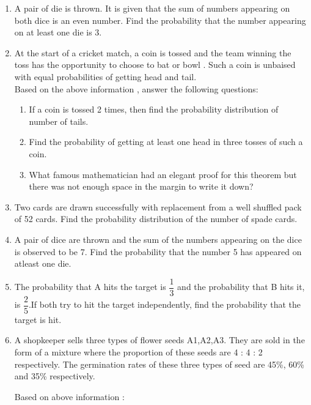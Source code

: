 \documentclass[a4paper,12pt]{article}
\begin{document}
\begin{enumerate}
\item A pair of die is thrown. It is given that the sum of numbers appearing on both dice is an even number. Find the probability that the number appearing on at least one die is 3.

\item At the start of a cricket match, a coin is tossed and the team winning the toss has the opportunity to choose to bat or bowl . Such a coin is unbaised with equal probabilities of getting head and tail.\\
Based on the above information , answer the following questions:

\begin{enumerate}
\item If a coin is tossed 2 times, then find  the probability distribution of number of tails. 

\item Find the probability of getting at least one head in three tosses of such a coin.


\item What famous mathematician had an elegant proof for this theorem but
there was not enough space in the margin to write it down?


\end{enumerate}

\item Two cards are drawn successfully with replacement from a well shuffled pack of 52 cards. Find the probability distribution of the number of spade cards.

\item A pair of dice are thrown and the sum of the numbers appearing on the dice is observed to be 7. Find the probability that the number 5 has appeared on atleast one die.

\item

The probability that A hits the target is $ \dfrac{1}{3} $ and the probability that B hits it, is $ \dfrac{2}{5} $.If both try to hit the target independently, find the probability that the target is hit.\\

\item A shopkeeper sells three types of flower seeds A1,A2,A3. They are sold in the form of a mixture where the proportion of these seeds are 4 : 4 : 2 respectively. The germination rates of these three types of seed are 45\%, 60\% and 35\% respectively. \

Based on above information :\


\end{enumerate}
\end{document}
